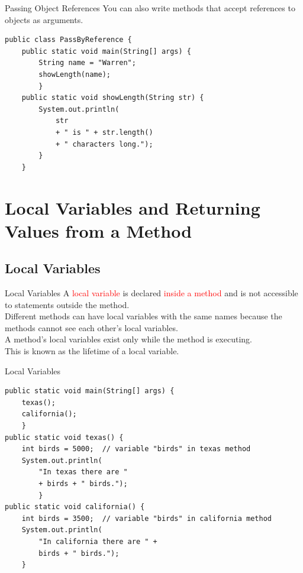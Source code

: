 \documentclass[11pt]{beamer}
\newcommand{\red}[1]{\textcolor{red}{#1}}
\begin{document}
\begin{frame}[fragile]{Passing Object References}
    You can also write methods that accept references to objects as arguments.
    \begin{lstlisting}
public class PassByReference {
    public static void main(String[] args) {
        String name = "Warren";
        showLength(name);
        }
    public static void showLength(String str) {
        System.out.println(
            str 
            + " is " + str.length() 
            + " characters long."); 
        }
    }
    \end{lstlisting}
\end{frame}

\section{Local Variables and Returning Values from a Method}
\subsection{Local Variables}
\begin{frame}{Local Variables}
    A \red{local variable} is declared \red{inside a method} and is not accessible to statements outside the method. \\ 
    \vspace{1em}
    Different methods can have local variables with the same names because the methods cannot see each other’s local variables. \\ 
    \vspace{1em}
    A method’s local variables exist only while the method is executing. \\
    \vspace{1em}
    This is known as the lifetime of a local variable. \\ 
    \vspace{1em}
\end{frame}

\begin{frame}[fragile]{Local Variables}
    \begin{lstlisting}
public static void main(String[] args) {
	texas();
	california();
	}
public static void texas() {
	int birds = 5000;  // variable "birds" in texas method
	System.out.println(
		"In texas there are "
		+ birds + " birds.");
		}
public static void california() {
	int birds = 3500;  // variable "birds" in california method
	System.out.println(
		"In california there are " +
		birds + " birds.");
	}
    \end{lstlisting}
\end{frame}
\end{document}
